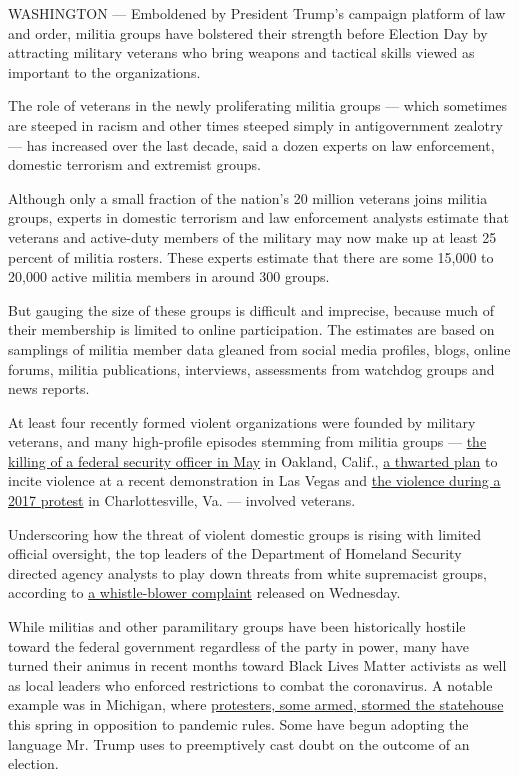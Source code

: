 WASHINGTON --- Emboldened by President Trump's campaign platform of law
and order, militia groups have bolstered their strength before Election
Day by attracting military veterans who bring weapons and tactical
skills viewed as important to the organizations.

The role of veterans in the newly proliferating militia groups --- which
sometimes are steeped in racism and other times steeped simply in
antigovernment zealotry --- has increased over the last decade, said a
dozen experts on law enforcement, domestic terrorism and extremist
groups.

Although only a small fraction of the nation's 20 million veterans joins
militia groups, experts in domestic terrorism and law enforcement
analysts estimate that veterans and active-duty members of the military
may now make up at least 25 percent of militia rosters. These experts
estimate that there are some 15,000 to 20,000 active militia members in
around 300 groups.

But gauging the size of these groups is difficult and imprecise, because
much of their membership is limited to online participation. The
estimates are based on samplings of militia member data gleaned from
social media profiles, blogs, online forums, militia publications,
interviews, assessments from watchdog groups and news reports.

At least four recently formed violent organizations were founded by
military veterans, and many high-profile episodes stemming from militia
groups ---
\href{https://www.nytimes3xbfgragh.onion/2020/06/16/us/steven-carrillo-air-force-boogaloo.html}{the
killing of a federal security officer in May} in Oakland, Calif.,
\href{https://apnews.com/6223153093f08fa910c4ab445771b773}{a thwarted
plan} to incite violence at a recent demonstration in Las Vegas and
\href{https://www.propublica.org/article/atomwaffen-division-hate-group-active-duty-military}{the
violence during a 2017 protest} in Charlottesville, Va. --- involved
veterans.

Underscoring how the threat of violent domestic groups is rising with
limited official oversight, the top leaders of the Department of
Homeland Security directed agency analysts to play down threats from
white supremacist groups, according to
\href{https://int.graylady3jvrrxbe.onion/data/documenttools/homeland-security-whistleblower/0819ec9ee29306a5/full.pdf}{a
whistle-blower complaint} released on Wednesday.

While militias and other paramilitary groups have been historically
hostile toward the federal government regardless of the party in power,
many have turned their animus in recent months toward Black Lives Matter
activists as well as local leaders who enforced restrictions to combat
the coronavirus. A notable example was in Michigan, where
\href{https://www.theguardian.com/world/2020/apr/17/far-right-coronavirus-protests-restrictions}{protesters,
some armed, stormed the statehouse} this spring in opposition to
pandemic rules. Some have begun adopting the language Mr. Trump uses to
preemptively cast doubt on the outcome of an election.

